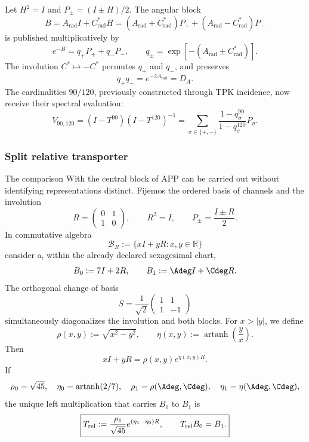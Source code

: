 Let \(H^2=I\) and \(P_\pm=(I\pm H)/2\). The angular block
\begin{equation}
 B=A_{\mathrm{rad}}I+C^*_{\mathrm{rad}}H
 =(A_{\mathrm{rad}}+C^*_{\mathrm{rad}})P_+
 +(A_{\mathrm{rad}}-C^*_{\mathrm{rad}})P_-
 \label{eq:l9s102:b-angular}
\end{equation}
is published multiplicatively by
\begin{equation}
 e^{-B}=q_+P_++q_-P_-,
 \qquad
 q_\pm=\exp[-(A_{\mathrm{rad}}\pm C^*_{\mathrm{rad}})].
 \label{eq:l9s102:qpm-angular}
\end{equation}
The involution \(C^*\mapsto-C^*\) permutes \(q_+\) and \(q_-\), and preserves
\begin{equation}
 q_+q_-=e^{-2A_{\mathrm{rad}}}=D_A.
 \label{eq:l9s102:det-angular}
\end{equation}
The cardinalities \(90/120\), previously constructed through TPK
incidence, now receive their spectral evaluation:
\begin{equation}
 V_{90,120}
 =(I-T^{90})(I-T^{120})^{-1}
 =\sum_{\sigma\in\{+,-\}}
 \frac{1-q_\sigma^{90}}{1-q_\sigma^{120}}P_\sigma.
 \label{eq:l9s102:v90120-posterior}
\end{equation}
\subsubsection{Split relative transporter}
\label{sec:s102:c38:6:3:1}

\label{p3-20260826:sec:transportador-relativo-split}

The comparison With the central block of APP can be carried out without identifying
representations distinct. Fijemos the ordered basis of channels and the
involution
\[
 R=\begin{pmatrix}0&1\\1&0\end{pmatrix},
 \qquad R^2=I,
 \qquad
 P_\pm=\frac{I\pm R}{2}.
\]
In commutative algebra
\[
 \mathscr B_R:=\{xI+yR:x,y\in\mathbb R\}
\]
consider a, within the already declared sexagesimal chart,
\[
 B_0:=7I+2R,
 \qquad
 B_1:=\Adeg I+\Cdeg R.
\]
The orthogonal change of basis
\[
 S=\frac1{\sqrt2}
 \begin{pmatrix}1&1\\1&-1\end{pmatrix}
\]
simultaneously diagonalizes the involution and both blocks. For \(x>|y|\),
we define
\[
 \rho(x,y):=\sqrt{x^2-y^2},
 \qquad
 \eta(x,y):=\operatorname{artanh}\!\left(\frac yx\right).
\]
Then
\[
 xI+yR=\rho(x,y)e^{\eta(x,y)R}.
\]
If
\[
 \rho_0=\sqrt{45},\quad
 \eta_0=\operatorname{artanh}(2/7),\quad
 \rho_1=\rho(\Adeg,\Cdeg),\quad
 \eta_1=\eta(\Adeg,\Cdeg),
\]
the unique left multiplication that carries \(B_0\) to \(B_1\) is
\[
 \boxed{
 T_{\rm rel}
 :=\frac{\rho_1}{\sqrt{45}}
 e^{(\eta_1-\eta_0)R},
 \qquad
 T_{\rm rel}B_0=B_1.}
\]


